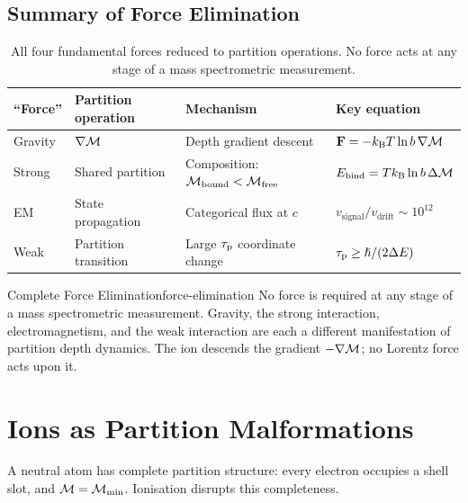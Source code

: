 \subsection{Summary of Force Elimination}

\begin{table}[htbp]
\centering
\caption{All four fundamental forces reduced to partition operations.
  No force acts at any stage of a mass spectrometric measurement.}
\label{tab:ch21-forces}
\begin{tabular}{@{}llll@{}}
\toprule
\textbf{``Force''} & \textbf{Partition operation} & \textbf{Mechanism}
  & \textbf{Key equation} \\
\midrule
Gravity   & $\nabla\mathcal{M}$ & Depth gradient descent
  & $\mathbf{F} = -k_{\mathrm{B}} T\ln b\,\nabla\mathcal{M}$ \\
Strong    & Shared partition & Composition: $\mathcal{M}_{\mathrm{bound}} <
  \mathcal{M}_{\mathrm{free}}$ & $E_{\mathrm{bind}} = Tk_{\mathrm{B}}\ln b\,\Delta\mathcal{M}$ \\
EM        & State propagation & Categorical flux at $c$
  & $v_{\mathrm{signal}}/v_{\mathrm{drift}} \sim 10^{12}$ \\
Weak      & Partition transition & Large $\tau_{\mathrm{p}}$ coordinate change
  & $\tau_{\mathrm{p}} \geq \hslash/(2\Delta E)$ \\
\bottomrule
\end{tabular}
\end{table}

\begin{consequence}{Complete Force Elimination}{force-elimination}
  No force is required at any stage of a mass spectrometric measurement.
  Gravity, the strong interaction, electromagnetism, and the weak interaction
  are each a different manifestation of partition depth dynamics.  The ion
  descends the gradient $-\nabla\mathcal{M}$; no Lorentz force acts upon it.
\end{consequence}

\section{Ions as Partition Malformations}
\label{sec:ch21-malformation}

A neutral atom has complete partition structure: every electron occupies a
shell slot, and $\mathcal{M} = \mathcal{M}_{\min}$.  Ionisation disrupts this
completeness.

